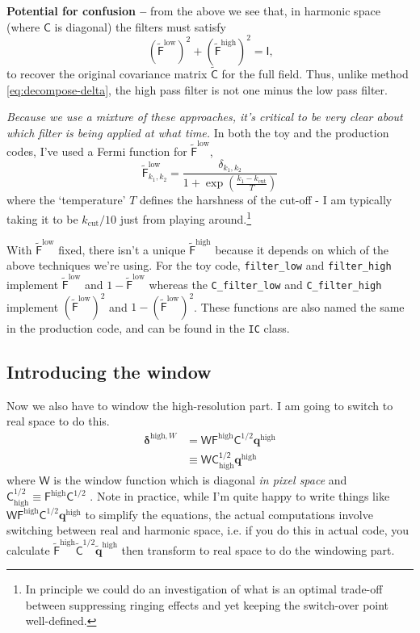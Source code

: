 \documentclass[11pt,a4paper,preprint]{aastex}
\newcommand{\low}{\mathrm{low}}
\newcommand{\high}{\mathrm{high}}
\newcommand{\bmath}[1]{\ensuremath{\bm{#1}}}
\renewcommand{\vec}[1]{\bmath{#1}}
\begin{document}
 \textbf{Potential for confusion --} from the above we see that, in harmonic space (where $\mathsf{C}$ is
diagonal) the filters must satisfy
\begin{equation}
(\tilde{\mathsf{F}}^{\low})^2+ (\tilde{\mathsf{F}}^{\high})^2 = \mathsf{I}\textrm{,}
\end{equation}
to recover the original covariance matrix $\tilde{\mathsf{C}}$ for the full
field. Thus, unlike method \eqref{eq:decompose-delta}, the high pass filter
is not one minus the low pass filter.

{\it Because we use a mixture of these
approaches, it's critical to be very clear about which filter is being
applied at what time.} In both the toy and the production codes, I've used
a Fermi function for $\tilde{\mathsf{F}}^{\low}$,
\begin{equation}
  \tilde{\mathsf{F}}^{\low}_{k_1, k_2}=\frac{\delta_{k_1,k_2}}{1+\exp\left(\frac{k_1-k_{\mathrm{cut}}}{T}\right)}
\end{equation}
where the `temperature' $T$ defines the harshness of the cut-off - I am typically
taking it to be $k_{\mathrm{cut}}/10$ just from playing around.\footnote{In principle
we could do an investigation of what is an optimal trade-off between
suppressing ringing effects and yet keeping the switch-over point well-defined.}

With $\tilde{\mathsf{F}}^{\low}$ fixed, there isn't a unique $\tilde{\mathsf{F}}^{\high}$ because
it depends on which of the above techniques we're using. For the toy code,
{\tt filter\_low} and {\tt filter\_high} implement $\tilde{\mathsf{F}}^{\low}$ and $1-\tilde{\mathsf{F}}^{\low}$
whereas the {\tt C\_filter\_low} and {\tt C\_filter\_high} implement $(\tilde{\mathsf{F}}^{\low})^2$ and $1-(\tilde{\mathsf{F}}^{\low})^2$.
These functions are also named the same in the production code, and can be found in the
{\tt IC} class.

\subsection{Introducing the window}

Now we also have to window the high-resolution part. I am going to switch to
real space to do this.
\begin{align}
\vec{\delta}^{\high,W} & = \mathsf{W} \mathsf{F}^{\high} \mathsf{C}^{1/2}
\vec{q}^{\high}\\
& \equiv \mathsf{WC_{\high}^{1/2}} \vec{q}^{\high} \label{eq:deltaII-ideal}
\end{align}
where $\mathsf{W}$ is the window function which is
diagonal {\it in pixel space} and $\mathsf{C}_{\high}^{1/2} \equiv
\mathsf{F}^{\high} \mathsf{C}^{1/2}$ .  Note in practice, while I'm quite happy to write
things like $\mathsf{W} \mathsf{F}^{\high} \mathsf{C}^{1/2} \vec{q}^{\high}$ to simplify
the equations, the actual
computations involve switching between real and harmonic space, i.e. if you do this in
actual code, you calculate
$\tilde{\mathsf{F}}^{\high} \tilde{\mathsf{C}}^{1/2} \tilde{\vec{q}}^{\high}$ then transform to real space to
do the windowing part.
\end{document}
